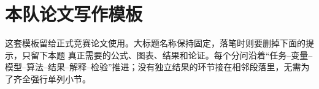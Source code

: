 \section{本队论文写作模板}

这套模板留给正式竞赛论文使用。大标题名称保持固定，落笔时则要删掉下面的提示，只留下本题
真正需要的公式、图表、结果和论证。每个分问沿着“任务--变量--模型--算法--结果--解释--检验”推进；没有独立结果的环节接在相邻段落里，无需为了齐全强行单列小节。

